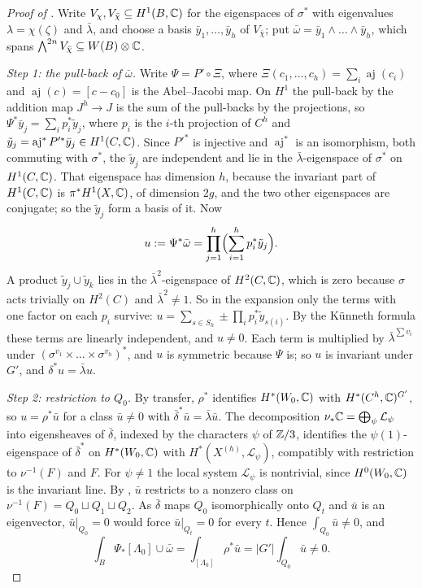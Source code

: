 \begin{proof}[Proof of ]
Write $V_{\chi},V_{\bar\chi}\subseteq H^{1}(B,\mathbb{C})$ for the eigenspaces of
$\sigma^{*}$ with eigenvalues $\lambda=\chi(\zeta)$ and $\bar\lambda$, and
choose a basis $\bar y_{1},\dots,\bar y_{h}$ of $V_{\bar\chi}$; put
$\bar\omega=\bar y_{1}\wedge\dots\wedge\bar y_{h}$, which spans
$\bigwedge^{2n}V_{\bar\chi}\subseteq W(B)\otimes\mathbb{C}$.

\emph{Step 1: the pull-back of $\bar\omega$.} Write $\Psi=P'\circ\Xi$, where
$\Xi(c_{1},\dots,c_{h})=\sum_{i}\operatorname{aj}(c_{i})$ and
$\operatorname{aj}(c)=[c-c_{0}]$ is the Abel--Jacobi map. On $H^{1}$ the
pull-back by the addition map $J^{h}\to J$ is the sum of the pull-backs by
the projections, so $\Psi^{*}\bar y_{j}=\sum_{i}p_{i}^{*}\tilde y_{j}$, where
$p_{i}$ is the $i$-th projection of $C^{h}$ and $\tilde y_{j}=
\operatorname{aj}^{*}P'^{*}\bar y_{j}\in H^{1}(C,\mathbb{C})$. Since $P'^{*}$ is
injective and $\operatorname{aj}^{*}$ is an isomorphism, both commuting with
$\sigma^{*}$, the $\tilde y_{j}$ are independent and lie in the
$\bar\lambda$-eigenspace of $\sigma^{*}$ on $H^{1}(C,\mathbb{C})$. That eigenspace
has dimension $h$, because the invariant part of $H^{1}(C,\mathbb{C})$ is
$\pi^{*}H^{1}(X,\mathbb{C})$, of dimension $2g$, and the two other eigenspaces are
conjugate; so the $\tilde y_{j}$ form a basis of it. Now
\[
  u:=\Psi^{*}\bar\omega=\prod_{j=1}^{h}\Bigl(\sum_{i=1}^{h}p_{i}^{*}
  \tilde y_{j}\Bigr).
\]
A product $\tilde y_{j}\cup\tilde y_{k}$ lies in the
$\bar\lambda^{2}$-eigenspace of $H^{2}(C,\mathbb{C})$, which is zero because
$\sigma$ acts trivially on $H^{2}(C)$ and $\bar\lambda^{2}\ne1$. So in the
expansion only the terms with one factor on each $p_{i}$ survive:
$u=\sum_{s\in S_{h}}\pm\prod_{i}p_{i}^{*}\tilde y_{s(i)}$. By the K\"unneth
formula these terms are linearly independent, and $u\ne0$. Each term is
multiplied by $\bar\lambda^{\sum v_{i}}$ under $(\sigma^{v_{1}}\times\dots
\times\sigma^{v_{h}})^{*}$, and $u$ is symmetric because $\Psi$ is; so $u$
is invariant under $G'$, and $\delta^{*}u=\bar\lambda u$.

\emph{Step 2: restriction to $Q_{0}$.} By transfer, $\rho^{*}$ identifies
$H^{*}(W_{0},\mathbb{C})$ with $H^{*}(C^{h},\mathbb{C})^{G'}$, so $u=\rho^{*}\bar u$ for a
class $\bar u\ne0$ with $\bar\delta^{*}\bar u=\bar\lambda\bar u$. The
decomposition $\nu_{*}\mathbb{C}=\bigoplus_{\psi}\mathcal{L}_{\psi}$ into
eigensheaves of $\bar\delta$, indexed by the characters $\psi$ of $\mathbb{Z}/3$,
identifies the $\psi(1)$-eigenspace of $\bar\delta^{*}$ on
$H^{*}(W_{0},\mathbb{C})$ with $H^{*}(X^{(h)},\mathcal{L}_{\psi})$, compatibly with
restriction to $\nu^{-1}(F)$ and $F$. For $\psi\ne1$ the local system
$\mathcal{L}_{\psi}$ is nontrivial, since $H^{0}(W_{0},\mathbb{C})$ is the
invariant line. By , $\bar u$ restricts to a nonzero class
on $\nu^{-1}(F)=Q_{0}\sqcup Q_{1}\sqcup Q_{2}$. As $\bar\delta$ maps $Q_{0}$
isomorphically onto $Q_{t}$ and $\bar u$ is an eigenvector, $\bar u|_{Q_{0}}
=0$ would force $\bar u|_{Q_{t}}=0$ for every $t$. Hence
$\int_{Q_{0}}\bar u\ne0$, and
\[
  \int_{B}\Psi_{*}[\Lambda_{0}]\cup\bar\omega
  =\int_{[\Lambda_{0}]}\rho^{*}\bar u
  =|G'|\int_{Q_{0}}\bar u\ne0.
\]


\end{proof}
